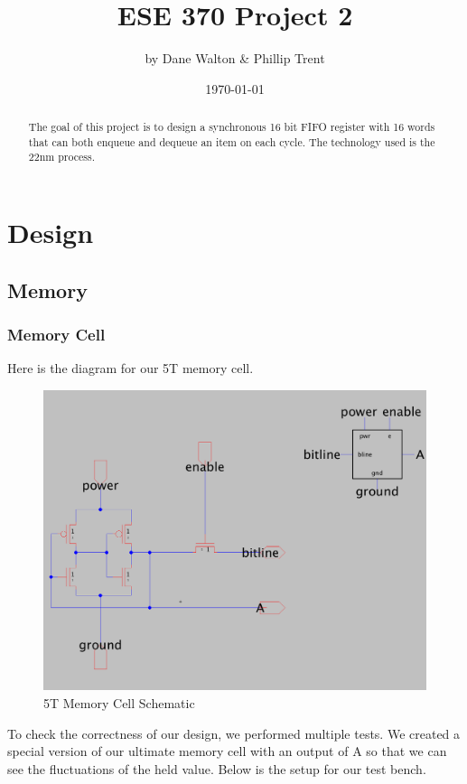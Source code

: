 \documentclass[a4paper]{article}
\title{ESE 370 Project 2}
\author{by Dane Walton \& Phillip Trent}
\date{\today}
\begin{document}
\maketitle
\tableofcontents
\newpage


\begin{abstract}
The goal of this project is to design a synchronous 16 bit FIFO register with 16 words that can both enqueue and dequeue an item on each cycle. The technology used is the 22nm process.
\end{abstract}

\section{Design}
\label{sec:design}
\subsection{Memory}
\subsubsection{Memory Cell}
Here is the diagram for our 5T memory cell.\\

\begin{figure}[H]
	\centering
 \includegraphics[scale=0.2]{5TCell}
 \caption{5T Memory Cell Schematic}
 \label{fig:5TCell}
\end{figure}
 
To check the correctness of our design, we performed multiple tests. We created a special version of our ultimate memory cell with an output of A so that we can see the fluctuations of the held value. Below is the setup for our test bench.\\
\end{document}
